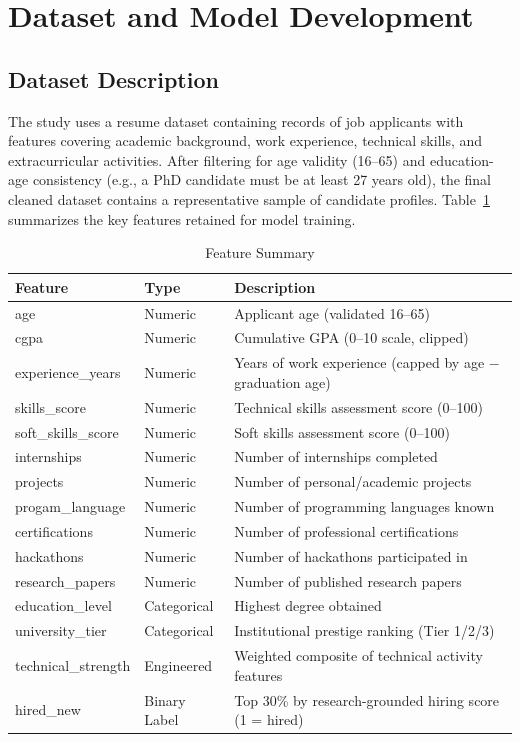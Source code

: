 \documentclass[conference]{IEEEtran}
\begin{document}
\section{Dataset and Model Development}

\subsection{Dataset Description}

The study uses a resume dataset containing records of job applicants with features covering academic background, work experience, technical skills, and extracurricular activities. After filtering for age validity (16--65) and education-age consistency (e.g., a PhD candidate must be at least 27 years old), the final cleaned dataset contains a representative sample of candidate profiles. Table~\ref{tab:features} summarizes the key features retained for model training.

\begin{table}[htbp]
\caption{Feature Summary}
\begin{center}
\begin{tabular}{|p{1.9cm}|p{1.1cm}|p{4.2cm}|}
\hline
\textbf{Feature} & \textbf{Type} & \textbf{Description} \\
\hline
age & Numeric & Applicant age (validated 16--65) \\
\hline
cgpa & Numeric & Cumulative GPA (0--10 scale, clipped) \\
\hline
experience\_years & Numeric & Years of work experience (capped by age $-$ graduation age) \\
\hline
skills\_score & Numeric & Technical skills assessment score (0--100) \\
\hline
soft\_skills\_score & Numeric & Soft skills assessment score (0--100) \\
\hline
internships & Numeric & Number of internships completed \\
\hline
projects & Numeric & Number of personal/academic projects \\
\hline
progam\_language & Numeric & Number of programming languages known \\
\hline
certifications & Numeric & Number of professional certifications \\
\hline
hackathons & Numeric & Number of hackathons participated in \\
\hline
research\_papers & Numeric & Number of published research papers \\
\hline
education\_level & Categorical & Highest degree obtained \\
\hline
university\_tier & Categorical & Institutional prestige ranking (Tier 1/2/3) \\
\hline
technical\_strength & Engineered & Weighted composite of technical activity features \\
\hline
hired\_new & Binary Label & Top 30\% by research-grounded hiring score (1 = hired) \\
\hline
\end{tabular}
\label{tab:features}
\end{center}
\end{table}
\end{document}
